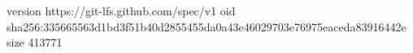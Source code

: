 version https://git-lfs.github.com/spec/v1
oid sha256:335665563d1bd3f51b40d2855455da0a43e46029703e76975eaceda83916442e
size 413771
